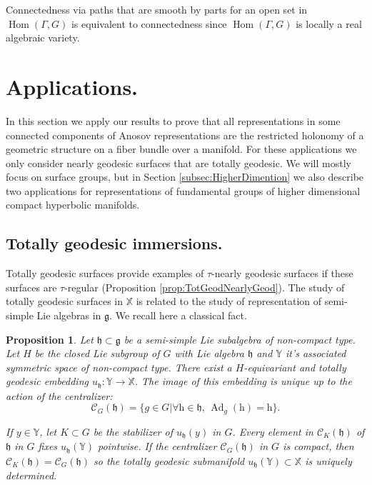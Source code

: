 \documentclass[reqno,10pt]{amsart}
\theoremstyle{plain}
\newtheorem{prop}[thm]{Proposition}
\theoremstyle{definition}
\theoremstyle{remark}
\newcommand{\type}{\tau}
\DeclareMathOperator{\Hom}{Hom}
\DeclareMathOperator{\Ad}{Ad}
\newcommand{\X}{\mathbb{X}}
\begin{document}
Connectedness via paths that are smooth by parts for an open set in $\Hom(\Gamma,G)$ is equivalent to connectedness since $\Hom(\Gamma,G)$ is locally a real algebraic variety.

\section{Applications.}

In this section we apply our results to prove that all representations in some connected components of Anosov representations are the restricted holonomy of a geometric structure on a fiber bundle over a manifold. For these applications we only consider nearly geodesic surfaces that are totally geodesic. We will mostly focus on surface groups, but in Section \ref{subsec:HigherDimention} we also describe two applications for representations of fundamental groups of higher dimensional compact hyperbolic manifolds. 

\subsection{Totally geodesic immersions.}
\label{subsec:TotallyGeodesic}
Totally geodesic surfaces provide examples of $\type$-nearly geodesic surfaces if these surfaces are $\type$-regular (Proposition \ref{prop:TotGeodNearlyGeod}). The study of totally geodesic surfaces in $\X$ is related to the study of representation of semi-simple Lie algebras in $\mathfrak{g}$. We recall here a classical fact.


\begin{prop}
\label{prop:TotallyGeodesic}
Let $\mathfrak{h}\subset \mathfrak{g}$ be a semi-simple Lie subalgebra of non-compact type. Let $H$ be the closed Lie subgroup of $G$ with Lie algebra $\mathfrak{h}$ and $\mathbb{Y}$ it's associated symmetric space of non-compact type. There exist a $H$-equivariant and totally geodesic embedding $u_\mathfrak{h} :\mathbb{Y}\to \X$. The image of this embedding is unique up to the action of the centralizer:
$$\mathcal{C}_G(\mathfrak{h})=\lbrace g\in G|\forall \mathrm{h}\in \mathfrak{h},\,\Ad_g(\mathrm{h})=\mathrm{h}\rbrace.$$

If $y\in \mathbb{Y}$, let $K\subset G$ be the stabilizer of $u_\mathfrak{h}(y)$ in $G$. Every element in $\mathcal{C}_K\left(\mathfrak{h}\right)$ of $\mathfrak{h}$ in $G$ fixes $u_\mathfrak{h}(\mathbb{Y})$ pointwise. If the centralizer $\mathcal{C}_G(\mathfrak{h})$ in $G$ is compact, then $\mathcal{C}_K\left(\mathfrak{h}\right)=\mathcal{C}_G(\mathfrak{h})$ so the totally geodesic submanifold $u_\mathfrak{h}(\mathbb{Y})\subset \X$ is uniquely determined.

\end{prop}
\end{document}
